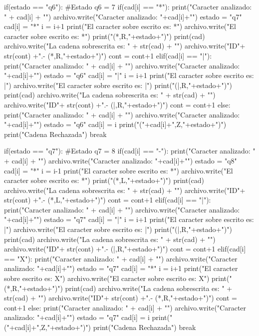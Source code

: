 \documentclass{article}
\begin{document}
\begin{python}
					if(estado == "q6"): #Estado q6 = 7
						if(cad[i] == "*"):
							print("Caracter analizado: " + cad[i] + "\n")
							archivo.write("Caracter analizado: "+cad[i]+"\n")
							estado = "q7"
							cad[i] = "*"
							i = i+1
							print("El caracter sobre escrito es: *\n")
							archivo.write("El caracter sobre escrito es: *\n")
							print("(*,R,"+estado+")\n")
							print(cad)
							archivo.write("La cadena sobrescrita es: " + str(cad) + "\n")
							archivo.write("ID"+ str(cont) +".- (*,R,"+estado+")\n\n")
							cont = cont+1
						elif(cad[i] == "|"):
							print("Caracter analizado: " + cad[i] + "\n")
							archivo.write("Caracter analizado: "+cad[i]+"\n")
							estado = "q6"
							cad[i] = "|"
							i = i+1
							print("El caracter sobre escrito es: |\n")
							archivo.write("El caracter sobre escrito es: |\n")
							print("(|,R,"+estado+")\n")
							print(cad)
							archivo.write("La cadena sobrescrita es: " + str(cad) + "\n")
							archivo.write("ID"+ str(cont) +".- (|,R,"+estado+")\n\n")
							cont = cont+1
						else:
							print("Caracter analizado: " + cad[i] + "\n")
							archivo.write("Caracter analizado: "+cad[i]+"\n")
							estado = "q6"
							cad[i] = i
							print("("+cad[i]+",Z,"+estado+")\n")
							print("Cadena Rechazada")
							break    
				
					if(estado == "q7"): #Estado q7 = 8
						if(cad[i] == "-"):
							print("Caracter analizado: " + cad[i] + "\n")
							archivo.write("Caracter analizado: "+cad[i]+"\n")
							estado = "q8"
							cad[i] = "*"
							i = i-1
							print("El caracter sobre escrito es: *\n")
							archivo.write("El caracter sobre escrito es: *\n")
							print("(*,L,"+estado+")\n")
							print(cad)
							archivo.write("La cadena sobrescrita es: " + str(cad) + "\n")
							archivo.write("ID"+ str(cont) +".- (*,L,"+estado+")\n\n")
							cont = cont+1
						elif(cad[i] == "|"):
							print("Caracter analizado: " + cad[i] + "\n")
							archivo.write("Caracter analizado: "+cad[i]+"\n")
							estado = "q7"
							cad[i] = "|"
							i = i+1
							print("El caracter sobre escrito es: |\n")
							archivo.write("El caracter sobre escrito es: |\n")
							print("(|,R,"+estado+")\n")
							print(cad)
							archivo.write("La cadena sobrescrita es: " + str(cad) + "\n")
							archivo.write("ID"+ str(cont) +".- (|,R,"+estado+")\n\n")
							cont = cont+1
						elif(cad[i] == "X"):
							print("Caracter analizado: " + cad[i] + "\n")
							archivo.write("Caracter analizado: "+cad[i]+"\n")
							estado = "q7"
							cad[i] = "*"
							i = i+1
							print("El caracter sobre escrito es: X\n")
							archivo.write("El caracter sobre escrito es: X\n")
							print("(*,R,"+estado+")\n")
							print(cad)
							archivo.write("La cadena sobrescrita es: " + str(cad) + "\n")
							archivo.write("ID"+ str(cont) +".- (*,R,"+estado+")\n\n")
							cont = cont+1
						else:
							print("Caracter analizado: " + cad[i] + "\n")
							archivo.write("Caracter analizado: "+cad[i]+"\n")
							estado = "q7"
							cad[i] = i
							print("("+cad[i]+",Z,"+estado+")\n")
							print("Cadena Rechazada")
							break 
				

\end{python}
\end{document}
